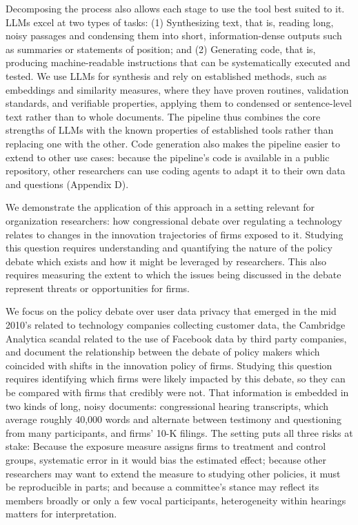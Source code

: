 \documentclass[11pt]{article}
\begin{document}
Decomposing the process also allows each stage to use the tool best suited to it. LLMs excel at two types of tasks: (1) Synthesizing text, that is, reading long, noisy passages and condensing them into short, information-dense outputs such as summaries or statements of position; and (2) Generating code, that is, producing machine-readable instructions that can be systematically executed and tested. We use LLMs for synthesis and rely on established methods, such as embeddings and similarity measures, where they have proven routines, validation standards, and verifiable properties, applying them to condensed or sentence-level text rather than to whole documents. The pipeline thus combines the core strengths of LLMs with the known properties of established tools rather than replacing one with the other. Code generation also makes the pipeline easier to extend to other use cases: because the pipeline's code is available in a public repository, other researchers can use coding agents to adapt it to their own data and questions (Appendix D).

We demonstrate the application of this approach in a setting relevant for organization researchers: how congressional debate over regulating a technology relates to changes in the innovation trajectories of firms exposed to it. Studying this question requires understanding and quantifying the nature of the policy debate which exists and how it might be leveraged by researchers. This also requires measuring the extent to which the issues being discussed in the debate represent threats or opportunities for firms.

We focus on the policy debate over user data privacy that emerged in the mid 2010's related to technology companies collecting customer data, the Cambridge Analytica scandal related to the use of Facebook data by third party companies, and document the relationship between the debate of policy makers which coincided with shifts in the innovation policy of firms. Studying this question requires identifying which firms were likely impacted by this debate, so they can be compared with firms that credibly were not. That information is embedded in two kinds of long, noisy documents: congressional hearing transcripts, which average roughly 40,000 words and alternate between testimony and questioning from many participants, and firms' 10-K filings. The setting puts all three risks at stake: Because the exposure measure assigns firms to treatment and control groups, systematic error in it would bias the estimated effect; because other researchers may want to extend the measure to studying other policies, it must be reproducible in parts; and because a committee's stance may reflect its members broadly or only a few vocal participants, heterogeneity within hearings matters for interpretation.
\end{document}
